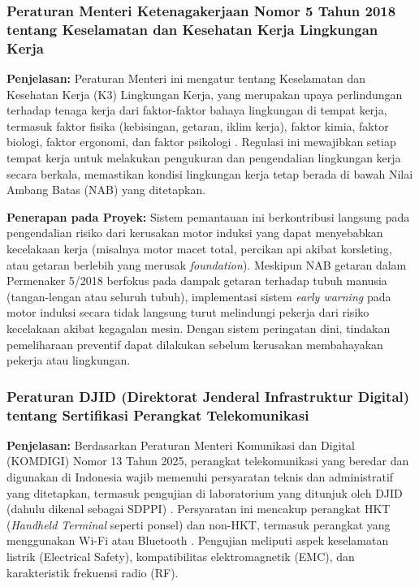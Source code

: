 \documentclass{elsinta}
\begin{document}
\subsubsection{Peraturan Menteri Ketenagakerjaan Nomor 5 Tahun 2018 tentang Keselamatan dan Kesehatan Kerja Lingkungan Kerja}

\textbf{Penjelasan:} Peraturan Menteri ini mengatur tentang Keselamatan dan Kesehatan Kerja (K3) Lingkungan Kerja, yang merupakan upaya perlindungan terhadap tenaga kerja dari faktor-faktor bahaya lingkungan di tempat kerja, termasuk faktor fisika (kebisingan, getaran, iklim kerja), faktor kimia, faktor biologi, faktor ergonomi, dan faktor psikologi \cite{MenteriKetenagakerjaanRepublikIndonesia2018}. Regulasi ini mewajibkan setiap tempat kerja untuk melakukan pengukuran dan pengendalian lingkungan kerja secara berkala, memastikan kondisi lingkungan kerja tetap berada di bawah Nilai Ambang Batas (NAB) yang ditetapkan.

\textbf{Penerapan pada Proyek:} Sistem pemantauan ini berkontribusi langsung pada pengendalian risiko dari kerusakan motor induksi yang dapat menyebabkan kecelakaan kerja (misalnya motor macet total, percikan api akibat korsleting, atau getaran berlebih yang merusak \textit{foundation}). Meskipun NAB getaran dalam Permenaker 5/2018 berfokus pada dampak getaran terhadap tubuh manusia (tangan-lengan atau seluruh tubuh), implementasi sistem \textit{early warning} pada motor induksi secara tidak langsung turut melindungi pekerja dari risiko kecelakaan akibat kegagalan mesin. Dengan sistem peringatan dini, tindakan pemeliharaan preventif dapat dilakukan sebelum kerusakan membahayakan pekerja atau lingkungan.

\subsubsection{Peraturan DJID (Direktorat Jenderal Infrastruktur Digital) tentang Sertifikasi Perangkat Telekomunikasi}

\textbf{Penjelasan:} Berdasarkan Peraturan Menteri Komunikasi dan Digital (KOMDIGI) Nomor 13 Tahun 2025, perangkat telekomunikasi yang beredar dan digunakan di Indonesia wajib memenuhi persyaratan teknis dan administratif yang ditetapkan, termasuk pengujian di laboratorium yang ditunjuk oleh DJID (dahulu dikenal sebagai SDPPI) \cite{KementerianKomunikasidanDigitalRepublikIndonesia2025}. Persyaratan ini mencakup perangkat HKT (\textit{Handheld Terminal} seperti ponsel) dan non-HKT, termasuk perangkat yang menggunakan Wi-Fi atau Bluetooth \cite{KementerianKomunikasidanDigitalRepublikIndonesia2025}. Pengujian meliputi aspek keselamatan listrik (Electrical Safety), kompatibilitas elektromagnetik (EMC), dan karakteristik frekuensi radio (RF).
\end{document}

